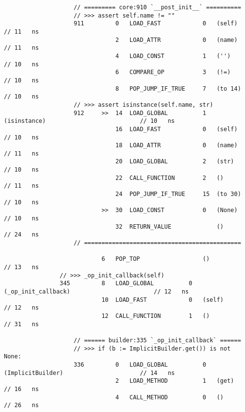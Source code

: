 \begin{code}
\begin{verbatim}
                    // ========= core:910 `__post_init__` ==========
                    // >>> assert self.name != ""
                    911         0   LOAD_FAST            0   (self)                                 // 11   ns
                                2   LOAD_ATTR            0   (name)                                 // 11   ns
                                4   LOAD_CONST           1   ('')                                   // 10   ns
                                6   COMPARE_OP           3   (!=)                                   // 10   ns
                                8   POP_JUMP_IF_TRUE     7   (to 14)                                // 10   ns
                    // >>> assert isinstance(self.name, str)
                    912     >>  14  LOAD_GLOBAL          1   (isinstance)                           // 10   ns
                                16  LOAD_FAST            0   (self)                                 // 10   ns
                                18  LOAD_ATTR            0   (name)                                 // 11   ns
                                20  LOAD_GLOBAL          2   (str)                                  // 10   ns
                                22  CALL_FUNCTION        2   ()                                     // 11   ns
                                24  POP_JUMP_IF_TRUE     15  (to 30)                                // 10   ns
                            >>  30  LOAD_CONST           0   (None)                                 // 10   ns
                                32  RETURN_VALUE             ()                                     // 24   ns
                    // =============================================

                            6   POP_TOP                  ()                                         // 13   ns
                // >>> _op_init_callback(self)
                345         8   LOAD_GLOBAL          0   (_op_init_callback)                        // 12   ns
                            10  LOAD_FAST            0   (self)                                     // 12   ns
                            12  CALL_FUNCTION        1   ()                                         // 31   ns

                    // ====== builder:335 `_op_init_callback` ======
                    // >>> if (b := ImplicitBuilder.get()) is not None:
                    336         0   LOAD_GLOBAL          0   (ImplicitBuilder)                      // 14   ns
                                2   LOAD_METHOD          1   (get)                                  // 16   ns
                                4   CALL_METHOD          0   ()                                     // 26   ns


\end{verbatim}
\end{code}
